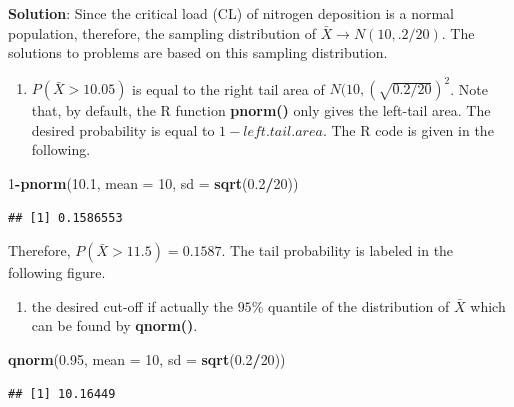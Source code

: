 \documentclass[
]{book}
\newenvironment{Shaded}{\begin{snugshade}}{\end{snugshade}}
\newcommand{\AttributeTok}[1]{\textcolor[rgb]{0.13,0.29,0.53}{#1}}
\newcommand{\DecValTok}[1]{\textcolor[rgb]{0.00,0.00,0.81}{#1}}
\newcommand{\FloatTok}[1]{\textcolor[rgb]{0.00,0.00,0.81}{#1}}
\newcommand{\FunctionTok}[1]{\textcolor[rgb]{0.13,0.29,0.53}{\textbf{#1}}}
\newcommand{\NormalTok}[1]{#1}
\newcommand{\SpecialCharTok}[1]{\textcolor[rgb]{0.81,0.36,0.00}{\textbf{#1}}}
\providecommand{\tightlist}{%
  \setlength{\itemsep}{0pt}\setlength{\parskip}{0pt}}
\begin{document}
\textbf{Solution}: Since the critical load (CL) of nitrogen deposition is a normal population, therefore, the sampling distribution of \(\bar{X} \to N(10, .2/20)\). The solutions to problems are based on this sampling distribution.

\begin{enumerate}
\def\labelenumi{\arabic{enumi}.}
\tightlist
\item
  \(P(\bar{X} > 10.05)\) is equal to the right tail area of \(N(10, (\sqrt{0.2/20})^2\). Note that, by default, the R function \textbf{pnorm()} only gives the left-tail area. The desired probability is equal to \(1 - left.tail.area\). The R code is given in the following.
\end{enumerate}

\begin{Shaded}
\begin{Highlighting}[]
\DecValTok{1}\SpecialCharTok{{-}}\FunctionTok{pnorm}\NormalTok{(}\FloatTok{10.1}\NormalTok{, }\AttributeTok{mean =} \DecValTok{10}\NormalTok{, }\AttributeTok{sd =} \FunctionTok{sqrt}\NormalTok{(}\FloatTok{0.2}\SpecialCharTok{/}\DecValTok{20}\NormalTok{))}
\end{Highlighting}
\end{Shaded}

\begin{verbatim}
## [1] 0.1586553
\end{verbatim}

Therefore, \(P(\bar{X} > 11.5) = 0.1587\). The tail probability is labeled in the following figure.

\begin{enumerate}
\def\labelenumi{\arabic{enumi}.}
\setcounter{enumi}{1}
\tightlist
\item
  the desired cut-off if actually the \(95\%\) quantile of the distribution of \(\bar{X}\) which can be found by \textbf{qnorm()}.
\end{enumerate}

\begin{Shaded}
\begin{Highlighting}[]
\FunctionTok{qnorm}\NormalTok{(}\FloatTok{0.95}\NormalTok{, }\AttributeTok{mean =} \DecValTok{10}\NormalTok{, }\AttributeTok{sd =} \FunctionTok{sqrt}\NormalTok{(}\FloatTok{0.2}\SpecialCharTok{/}\DecValTok{20}\NormalTok{))}
\end{Highlighting}
\end{Shaded}

\begin{verbatim}
## [1] 10.16449
\end{verbatim}
\end{document}
